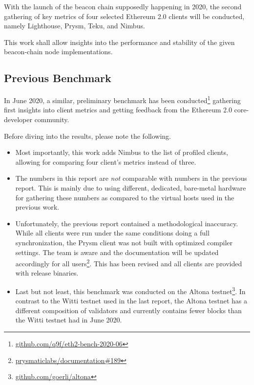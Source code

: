 \documentclass[twoside,twocolumn]{article}
\begin{document}
With the launch of the beacon chain supposedly happening in 2020, the second gathering of key metrics of four selected Ethereum 2.0 clients will be conducted, namely Lighthouse, Prysm, Teku, and Nimbus.\par

This work shall allow insights into the performance and stability of the given beacon-chain node implementations.\par

\subsection{Previous Benchmark}
In June 2020, a similar, preliminary benchmark has been conducted\footnote{\href{https://github.com/q9f/eth2-bench-2020-06}{github.com/q9f/eth2-bench-2020-06}} gathering first insights into client metrics and getting feedback from the Ethereum 2.0 core-developer community.\par

Before diving into the results, please note the following.

\begin{itemize}
\item Most importantly, this work adds Nimbus to the list of profiled clients, allowing for comparing four client's metrics instead of three.
\item The numbers in this report are \textit{not} comparable with numbers in the previous report. This is mainly due to using different, dedicated, bare-metal hardware for gathering these numbers as compared to the virtual hosts used in the previous work.
\item Unfortunately, the previous report contained a methodological inaccuracy. While all clients were run under the same conditions doing a full synchronization, the Prysm client was not built with optimized compiler settings. The team is aware and the documentation will be updated accordingly for all users\footnote{\href{https://github.com/prysmaticlabs/documentation/issues/189}{prysmaticlabs/documentation\#189}}. This has been revised and all clients are provided with release binaries.
\item Last but not least, this benchmark was conducted on the Altona testnet\footnote{\href{https://github.com/goerli/altona}{github.com/goerli/altona}}. In contrast to the Witti testnet used in the last report, the Altona testnet has a different composition of validators and currently contains fewer blocks than the Witti testnet had in June 2020.
\end{itemize}
\end{document}
